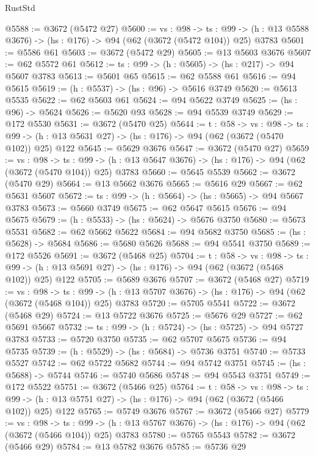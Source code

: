 \begin{lexlean}{RustStd}
\begin{coremodule}
{\begin{coremodule}
{{{{{{{{{{{@5588 := @3672 (@5472 @27)
@5600 := {vs : @98} ->
  {ts : @99} -> (h : @13 @5588 @3676) -> (hs : @176) -> @94 (@62 (@3672 (@5472 @104)) @25) @3783
@5601 := @5586 @61
@5603 := @3672 (@5472 @29)
@5605 := @13 @5603 @3676
@5607 := @62 @5572 @61
@5612 := {ts : @99} -> (h : @5605) -> (hs : @217) -> @94 @5607 @3783
@5613 := @5601 @65
@5615 := @62 @5588 @61
@5616 := @94 @5615
@5619 := (h : @5537) -> (hs : @96) -> @5616 @3749
@5620 := @5613 @5535
@5622 := @62 @5603 @61
@5624 := @94 @5622 @3749
@5625 := (hs : @96) -> @5624
@5626 := @5620 @93
@5628 := @94 @5539 @3749
@5629 := @172 @5530
@5631 := @3672 (@5470 @25)
@5644 := {t : @58} ->
  {vs : @98} ->
  {ts : @99} -> (h : @13 @5631 @27) -> (hs : @176) -> @94 (@62 (@3672 (@5470 @102)) @25) @122
@5645 := @5629 @3676
@5647 := @3672 (@5470 @27)
@5659 := {vs : @98} ->
  {ts : @99} -> (h : @13 @5647 @3676) -> (hs : @176) -> @94 (@62 (@3672 (@5470 @104)) @25) @3783
@5660 := @5645 @5539
@5662 := @3672 (@5470 @29)
@5664 := @13 @5662 @3676
@5665 := @5616 @29
@5667 := @62 @5631 @5607
@5672 := {ts : @99} -> (h : @5664) -> (hs : @5665) -> @94 @5667 @3783
@5673 := @5660 @3749
@5675 := @62 @5647 @5615
@5676 := @94 @5675
@5679 := (h : @5533) -> (hs : @5624) -> @5676 @3750
@5680 := @5673 @5531
@5682 := @62 @5662 @5622
@5684 := @94 @5682 @3750
@5685 := (hs : @5628) -> @5684
@5686 := @5680 @5626
@5688 := @94 @5541 @3750
@5689 := @172 @5526
@5691 := @3672 (@5468 @25)
@5704 := {t : @58} ->
  {vs : @98} ->
  {ts : @99} -> (h : @13 @5691 @27) -> (hs : @176) -> @94 (@62 (@3672 (@5468 @102)) @25) @122
@5705 := @5689 @3676
@5707 := @3672 (@5468 @27)
@5719 := {vs : @98} ->
  {ts : @99} -> (h : @13 @5707 @3676) -> (hs : @176) -> @94 (@62 (@3672 (@5468 @104)) @25) @3783
@5720 := @5705 @5541
@5722 := @3672 (@5468 @29)
@5724 := @13 @5722 @3676
@5725 := @5676 @29
@5727 := @62 @5691 @5667
@5732 := {ts : @99} -> (h : @5724) -> (hs : @5725) -> @94 @5727 @3783
@5733 := @5720 @3750
@5735 := @62 @5707 @5675
@5736 := @94 @5735
@5739 := (h : @5529) -> (hs : @5684) -> @5736 @3751
@5740 := @5733 @5527
@5742 := @62 @5722 @5682
@5744 := @94 @5742 @3751
@5745 := (hs : @5688) -> @5744
@5746 := @5740 @5686
@5748 := @94 @5543 @3751
@5749 := @172 @5522
@5751 := @3672 (@5466 @25)
@5764 := {t : @58} ->
  {vs : @98} ->
  {ts : @99} -> (h : @13 @5751 @27) -> (hs : @176) -> @94 (@62 (@3672 (@5466 @102)) @25) @122
@5765 := @5749 @3676
@5767 := @3672 (@5466 @27)
@5779 := {vs : @98} ->
  {ts : @99} -> (h : @13 @5767 @3676) -> (hs : @176) -> @94 (@62 (@3672 (@5466 @104)) @25) @3783
@5780 := @5765 @5543
@5782 := @3672 (@5466 @29)
@5784 := @13 @5782 @3676
@5785 := @5736 @29
}}}}}}}}}}}
\end{coremodule}}
\end{coremodule}
\end{lexlean}
